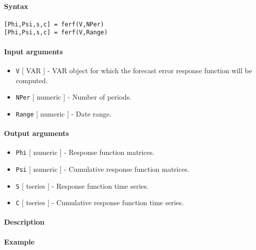 


	\paragraph{Syntax}\label{syntax}

\begin{verbatim}
[Phi,Psi,s,c] = ferf(V,NPer)
[Phi,Psi,s,c] = ferf(V,Range)
\end{verbatim}

\paragraph{Input arguments}\label{input-arguments}

\begin{itemize}
\item
  \texttt{V} {[} VAR {]} - VAR object for which the forecast error
  response function will be computed.
\item
  \texttt{NPer} {[} numeric {]} - Number of periods.
\item
  \texttt{Range} {[} numeric {]} - Date range.
\end{itemize}

\paragraph{Output arguments}\label{output-arguments}

\begin{itemize}
\item
  \texttt{Phi} {[} numeric {]} - Response function matrices.
\item
  \texttt{Psi} {[} numeric {]} - Cumulative response function matrices.
\item
  \texttt{S} {[} tseries {]} - Response function time series.
\item
  \texttt{C} {[} tseries {]} - Cumulative response function time series.
\end{itemize}

\paragraph{Description}\label{description}

\paragraph{Example}\label{example}


